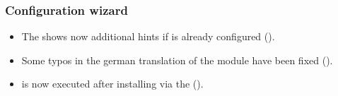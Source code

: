 \subsubsection{Configuration wizard}
\begin{itemize}
\item The  shows now additional hints if  is already configured ().
\item Some typos in the german translation of the  module have been fixed ().
\item {} is now executed after installing  via the  ().
\end{itemize}

